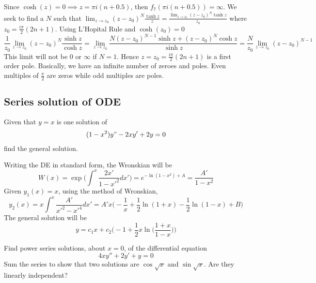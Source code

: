 \documentclass[a4paper]{article}
\begin{document}
\begin{ans}
\begin{itemize}
    Since $\cosh(z)=0\implies z=\pi i(n+0.5)$, then $f_7(\pi i(n+0.5))=\infty$. We seek to find a $N$ such that $\lim_{z\rightarrow z_0}(z-z_0)^N\frac{\tanh z}{z}=\frac{\lim_{z\rightarrow z_0}(z-z_0)^N\tanh z}{z_0}$ where $z_0=\frac{i\pi}{2}(2n+1)$. Using L'Hopital Rule and $\cosh(z_0)=0$
    $$\frac{1}{z_0}\lim_{z\rightarrow z_0}(z-z_0)^N\frac{\sinh z}{\cosh z}=\lim_{z\rightarrow z_0}\frac{N(z-z_0)^{N-1}\sinh z+(z-z_0)^N\cosh z}{\sinh z}=\frac{N}{z_0}\lim_{z\rightarrow z_0}(z-z_0)^{N-1}$$
    This limit will not be $0$ or $\infty$ if $N=1$. Hence $z=z_0=\frac{i\pi}{2}(2n+1)$ is a first order pole. Basically, we have an infinite number of zeroes and poles. Even multiples of $\frac{\pi}{2}$ are zeros while odd multiples are poles.
\end{itemize}
\end{ans}
\newpage
\subsection*{Series solution of ODE}
\begin{qns}[Wronskian]
Given that $y = x$ is one solution of
$$(1-x^2)y"-2xy'+2y=0$$
find the general solution.
\end{qns}
\begin{ans}
Writing the DE in standard form, the Wronskian will be
$$W(x)=\exp\bigg(\int^x\frac{2x'}{1-x'^2}dx'\bigg)=e^{-\ln(1-x^2)+A}=\frac{A'}{1-x^2}$$
Given $y_1(x)=x$, using the method of Wronskian, 
$$y_2(x)=x\int^x\frac{A'}{x'^2-x'^4}dx'=A'x\bigg(-\frac{1}{x}+\frac{1}{2}\ln(1+x)-\frac{1}{2}\ln(1-x)+B\bigg)$$
The general solution will be 
$$y=c_1x+c_2\bigg(-1+\frac{1}{2}x\ln\bigg(\frac{1+x}{1-x}\bigg)\bigg)$$
\end{ans}
\begin{qns}
Find power series solutions, about $x = 0$, of the differential equation
$$4xy''+2y'+y=0$$
Sum the series to show that two solutions are $\cos\sqrt{x}$ and $\sin\sqrt{x}$. Are they linearly
independent?
\end{qns}
\end{document}
